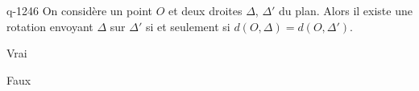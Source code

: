 \begin{truefalse}{q-1246}
On considère un point $O$ et deux droites $\Delta$, $\Delta'$ du plan. Alors il existe une rotation envoyant $\Delta$ sur $\Delta'$ si et seulement si $d(O,\Delta) = d(O,\Delta')$.
\item* Vrai
\item Faux
\end{truefalse}

